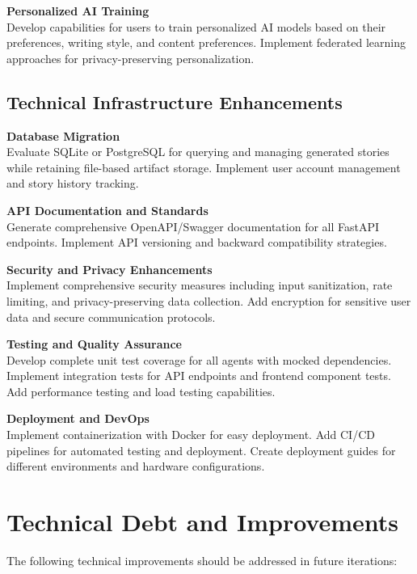 \textbf{Personalized AI Training}\\
Develop capabilities for users to train personalized AI models based on their preferences, writing style, and content preferences. Implement federated learning approaches for privacy-preserving personalization.

\subsection{Technical Infrastructure Enhancements}

\textbf{Database Migration}\\
Evaluate SQLite or PostgreSQL for querying and managing generated stories while retaining file-based artifact storage. Implement user account management and story history tracking.

\textbf{API Documentation and Standards}\\
Generate comprehensive OpenAPI/Swagger documentation for all FastAPI endpoints. Implement API versioning and backward compatibility strategies.

\textbf{Security and Privacy Enhancements}\\
Implement comprehensive security measures including input sanitization, rate limiting, and privacy-preserving data collection. Add encryption for sensitive user data and secure communication protocols.

\textbf{Testing and Quality Assurance}\\
Develop complete unit test coverage for all agents with mocked dependencies. Implement integration tests for API endpoints and frontend component tests. Add performance testing and load testing capabilities.

\textbf{Deployment and DevOps}\\
Implement containerization with Docker for easy deployment. Add CI/CD pipelines for automated testing and deployment. Create deployment guides for different environments and hardware configurations.

\section{Technical Debt and Improvements}

The following technical improvements should be addressed in future iterations:

